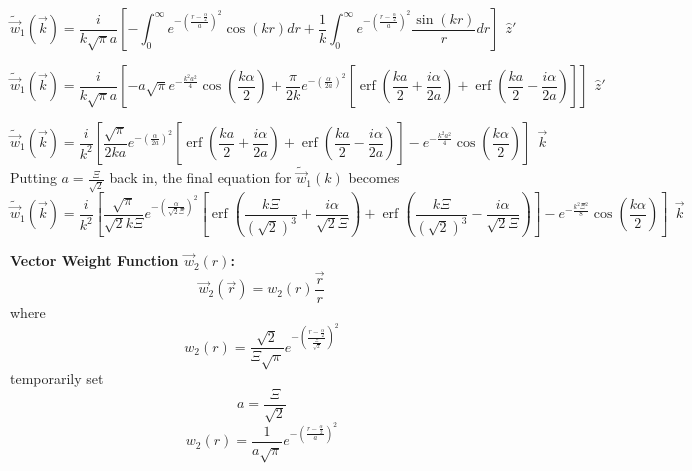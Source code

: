 \documentclass[letterpaper,twocolumn,amsmath,amssymb,prb]{revtex4-1}
\begin{document}
\begin{widetext}
\begin{equation}{\widetilde{\vec{w}}_1(\vec{k})=\frac{i}{k\sqrt{\pi}a}\left[-\int_{0}^{\infty}e^{-\left(\frac{r-\frac{\alpha}{2}}{a}\right)^2}\cos(kr)d{r}+\frac{1}{k}\int_{0}^{\infty}e^{-\left(\frac{r-\frac{\alpha}{2}}{a}\right)^2}\frac{\sin(kr)}{r}d{r}\right]{~~}\hat{z}'}\end{equation}

\begin{equation}{\widetilde{\vec{w}}_1(\vec{k})=\frac{i}{k\sqrt{\pi}a}\left[-a\sqrt{\pi}e^{-\frac{k^2a^2}{4}}\cos\left(\frac{k\alpha}{2}\right)+\frac{\pi}{2k}e^{-\left(\frac{\alpha}{2a}\right)^2}\left[\operatorname{erf}\left(\frac{ka}{2}+\frac{i\alpha}{2a}\right)+\operatorname{erf}\left(\frac{ka}{2}-\frac{i\alpha}{2a}\right)\right]\right]{~~}\hat{z}'}\end{equation}

\begin{equation}{\widetilde{\vec{w}}_1(\vec{k})=\frac{i}{k^2}\left[\frac{\sqrt{\pi}}{2ka}e^{-\left(\frac{\alpha}{2a}\right)^2}\left[\operatorname{erf}\left(\frac{ka}{2}+\frac{i\alpha}{2a}\right)+\operatorname{erf}\left(\frac{ka}{2}-\frac{i\alpha}{2a}\right)\right]-e^{-\frac{k^2a^2}{4}}\cos\left(\frac{k\alpha}{2}\right)\right]{~~}\vec{k}}\end{equation}
Putting $a=\frac{\Xi}{\sqrt{2}}$ back in, the final equation for $\widetilde{\vec{w}}_1(k)$ becomes
\begin{equation}{\widetilde{\vec{w}}_1(\vec{k})=\frac{i}{k^2}\left[\frac{\sqrt{\pi}}{\sqrt{2}k\Xi}e^{-\left(\frac{\alpha}{\sqrt{2}\Xi}\right)^2}\left[\operatorname{erf}\left(\frac{k\Xi}{(\sqrt{2})^3}+\frac{i\alpha}{\sqrt{2}\Xi}\right)+\operatorname{erf}\left(\frac{k\Xi}{(\sqrt{2})^3}-\frac{i\alpha}{\sqrt{2}\Xi}\right)\right]-e^{-\frac{k^2\Xi^2}{8}}\cos\left(\frac{k\alpha}{2}\right)\right]{~~}\vec{k}}\end{equation}
\[{}\]

\noindent\textbf{Vector Weight Function $\vec{w}_2(r)$:}
\begin{equation}{\vec{w}_2(\vec{r})=w_2(r)\frac{\vec{r}}{r}}\end{equation}
where
\begin{equation}{w_2(r)=\frac{\sqrt{2}}{\Xi\sqrt{\pi}}e^{-\left(\frac{r-\frac{\alpha}{2}}{\frac{\Xi}{\sqrt{2}}}\right)^2}}\end{equation}
temporarily set 
\begin{equation}{a=\frac{\Xi}{\sqrt{2}}}\end{equation}
\begin{equation}{w_2(r)=\frac{1}{a\sqrt{\pi}}e^{-\left(\frac{r-\frac{\alpha}{2}}{a}\right)^2}}\end{equation}


\end{widetext}
\end{document}
